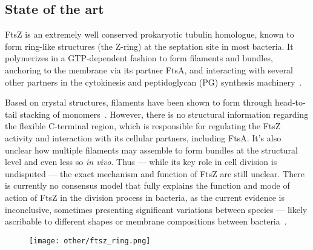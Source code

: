 \subsection{State of the art}


FtsZ is an extremely well conserved prokaryotic tubulin homologue, known to form ring-like structures (the Z-ring) at the septation site in most bacteria.
It polymerizes in a GTP-dependent fashion to form filaments and bundles, anchoring to the membrane via its partner FtsA, and interacting with several other partners in the cytokinesis and peptidoglycan (PG) synthesis machinery~\cite{barrowsFtsZDynamicsBacterial2021,mcquillenInsightsStructureFunction2020}.

Based on crystal structures, filaments have been shown to form through head-to-tail stacking of monomers~\cite{olivaStructuralInsightsFtsZ2004,barrowsFtsZDynamicsBacterial2021,mcquillenInsightsStructureFunction2020}.
However, there is no structural information regarding the flexible C-terminal region, which is responsible for regulating the FtsZ activity and interaction with its cellular partners, including FtsA.
It's also unclear how multiple filaments may assemble to form bundles at the structural level and even less so \textit{in vivo}.
Thus --- while its key role in cell division is undisputed --- the exact mechanism and function of FtsZ are still unclear.
There is currently no consensus model that fully explains the function and mode of action of FtsZ in the division process in bacteria, as the current evidence is inconclusive, sometimes presenting significant variations between species --- likely ascribable to different shapes or membrane compositions between bacteria~\cite{barrowsFtsZDynamicsBacterial2021,mcquillenInsightsStructureFunction2020}.

\begin{figure}[ht]
    \centering
    \texttt{[image: other/ftsz\_ring.png]}
    \label{fig:ftsz_ring}
\end{figure}

